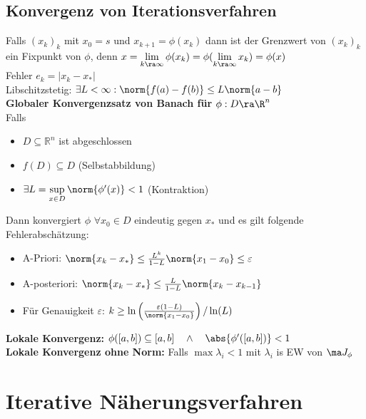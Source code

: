\documentclass[fs, footer]{latex4ei}
\begin{document}
\begin{sectionbox}
\begin{sectionbox}
\begin{sectionbox}
	\subsection{Konvergenz von Iterationsverfahren}
	Falls $(x_k)_k$ mit $x_0 = s$ und $x_{k+1} = \phi(x_k)$ dann ist der Grenzwert von $(x_k)_k$ ein Fixpunkt von $\phi$,
	denn $x = \lim\limits_{k \ra \infty} \phi(x_k) = \phi(\lim\limits_{k \ra \infty} x_k) = \phi(x)$\\
	Fehler $e_k = |x_k - x_*|$\\
	Libschitzstetig: $\exists L < \infty:\norm{f(a)-f(b)} \le L \norm{a-b}$\\
	\textbf{Globaler Konvergenzsatz von Banach für $\phi:D\ra\R^n$} \\
	Falls \begin{itemize}\itemsep0pt
		\item $D \subseteq \mathbb R^n$ ist abgeschlossen
		\item $f(D) \subseteq D$ (Selbstabbildung)
		\item $\exists L = \sup\limits_{x\in D} \norm{\phi'(x)} < 1$ \quad (Kontraktion)\\
	\end{itemize}
	Dann konvergiert $\phi$ $\forall x_0 \in D$ eindeutig gegen $x_*$ und es gilt folgende Fehlerabschätzung:
	\begin{itemize}\itemsep1pt
		\item A-Priori: $\norm{x_k - x_*} \le \frac{L^k}{1 - L} \norm{x_1 -x_0} \le \varepsilon$
		\item A-posteriori: $\norm{x_k - x_*} \le \frac{L}{1 - L} \norm{x_k -x_{k-1}}$
		\item Für Genauigkeit $\varepsilon$: $k \ge \ln\left( \frac{\varepsilon(1-L)}{\norm{x_1 -x_0}}\right) / \ln(L)$
	\end{itemize}
	\textbf{Lokale Konvergenz:} $\phi([a,b]) \subseteq [a,b] \quad \land \quad \abs{\phi'([a,b])} < 1$\\
	\textbf{Lokale Konvergenz ohne Norm:} Falls $\max{\lambda_i} < 1$ mit $\lambda_i$ is EW von $\ma J_\phi$\\
\end{sectionbox}

\section{Iterative Näherungsverfahren}
\begin{sectionbox}

\end{sectionbox}
\end{sectionbox}
\end{sectionbox}
\end{document}

